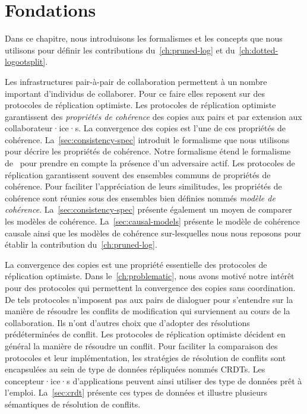 
\chapter{Fondations}\label{ch:background}

\minitoc{}
\bigskip

Dans ce chapitre, nous introduisons les formalismes et les concepts que nous utilisons pour définir les contributions du~\autoref{ch:pruned-log} et du~\autoref{ch:dotted-logootsplit}.

Les infrastructures pair-à-pair de collaboration permettent à un nombre important d'individus de collaborer.
Pour ce faire elles reposent sur des protocoles de réplication optimiste.
Les protocoles de réplication optimiste garantissent des \emph{propriétés de cohérence} des copies aux pairs et par extension aux collaborateur·ice·s.
La convergence des copies est l'une de ces propriétés de cohérence.
La~\autoref{sec:consistency-spec} introduit le formalisme que nous utilisons pour décrire les propriétés de cohérence.
Notre formalisme étend le formalisme de~\textcite{burckhardt_eventualconsistency_2014} pour prendre en compte la présence d'un adversaire actif.
Les protocoles de réplication garantissent souvent des ensembles communs de propriétés de cohérence.
Pour faciliter l'appréciation de leurs similitudes, les propriétés de cohérence sont réunies sous des ensembles bien définies nommés \emph{modèle de cohérence}.
La~\autoref{sec:consistency-spec} présente également un moyen de comparer les modèles de cohérence.
La~\autoref{sec:causal-models} présente le modèle de cohérence causale ainsi que les modèles de cohérence sur-lesquelles nous nous reposons pour établir la contribution du~\autoref{ch:pruned-log}.

La convergence des copies est une propriété essentielle des protocoles de réplication optimiste.
Dans le~\autoref{ch:problematic}, nous avons motivé notre intérêt pour des protocoles qui permettent la convergence des copies sans coordination.
De tels protocoles n'imposent pas aux pairs de dialoguer pour s'entendre sur la manière de résoudre les conflits de modification qui surviennent au cours de la collaboration.
Ils n'ont d'autres choix que d'adopter des résolutions prédéterminées de conflit.
Les protocoles de réplication optimiste décident en général la manière de résoudre un conflit.
Pour faciliter la comparaison des protocoles et leur implémentation, les stratégies de résolution de conflits sont encapsulées au sein de type de données répliquées nommés \acfp{CRDT}.
Les concepteur·ice·s d'applications peuvent ainsi utiliser des type de données prêt à l'emploi.
La~\autoref{sec:crdt} présente ces types de données et illustre plusieurs sémantiques de résolution de conflits.

